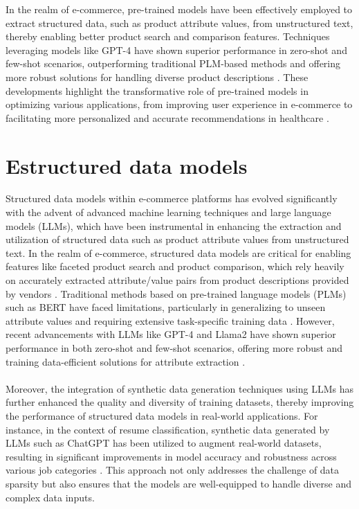 In the realm of e-commerce, pre-trained models have been effectively employed to extract structured data, such as product attribute values, from unstructured text, thereby enabling better product search and comparison features. Techniques leveraging models like GPT-4 have shown superior performance in zero-shot and few-shot scenarios, outperforming traditional PLM-based methods and offering more robust solutions for handling diverse product descriptions \cite{brinkmann2024product}. These developments highlight the transformative role of pre-trained models in optimizing various applications, from improving user experience in e-commerce to facilitating more personalized and accurate recommendations in healthcare \cite{labrak2024biomistral}.

\section{Estructured data models}
Structured data models within e-commerce platforms has evolved significantly with the advent of advanced machine learning techniques and large language models (LLMs), which have been instrumental in enhancing the extraction and utilization of structured data such as product attribute values from unstructured text. In the realm of e-commerce, structured data models are critical for enabling features like faceted product search and product comparison, which rely heavily on accurately extracted attribute/value pairs from product descriptions provided by vendors \cite{brinkmann2024product}. Traditional methods based on pre-trained language models (PLMs) such as BERT have faced limitations, particularly in generalizing to unseen attribute values and requiring extensive task-specific training data \cite{brinkmann2024product}. However, recent advancements with LLMs like GPT-4 and Llama2 have shown superior performance in both zero-shot and few-shot scenarios, offering more robust and training data-efficient solutions for attribute extraction \cite{brinkmann2024product}. 
\\\\
Moreover, the integration of synthetic data generation techniques using LLMs has further enhanced the quality and diversity of training datasets, thereby improving the performance of structured data models in real-world applications. For instance, in the context of resume classification, synthetic data generated by LLMs such as ChatGPT has been utilized to augment real-world datasets, resulting in significant improvements in model accuracy and robustness across various job categories \cite{skondras2023generating}. This approach not only addresses the challenge of data sparsity but also ensures that the models are well-equipped to handle diverse and complex data inputs. 
